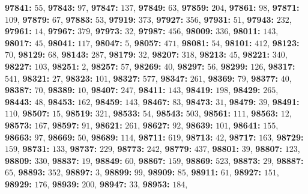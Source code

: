 \textsf{\bfseries 97841:} $55$, \textsf{\bfseries 97843:} $97$, \textsf{\bfseries 97847:} $137$, \textsf{\bfseries 97849:} $63$, \textsf{\bfseries 97859:} $204$, \textsf{\bfseries 97861:} $98$, \textsf{\bfseries 97871:} $109$, \textsf{\bfseries 97879:} $67$, \textsf{\bfseries 97883:} $53$, \textsf{\bfseries 97919:} $373$, \textsf{\bfseries 97927:} $356$, \textsf{\bfseries 97931:} $51$, \textsf{\bfseries 97943:} $232$, \textsf{\bfseries 97961:} $14$, \textsf{\bfseries 97967:} $379$, \textsf{\bfseries 97973:} $32$, \textsf{\bfseries 97987:} $456$, \textsf{\bfseries 98009:} $336$, \textsf{\bfseries 98011:} $143$, \textsf{\bfseries 98017:} $45$, \textsf{\bfseries 98041:} $117$, \textsf{\bfseries 98047:} $5$, \textsf{\bfseries 98057:} $471$, \textsf{\bfseries 98081:} $54$, \textsf{\bfseries 98101:} $412$, \textsf{\bfseries 98123:} $70$, \textsf{\bfseries 98129:} $68$, \textsf{\bfseries 98143:} $287$, \textsf{\bfseries 98179:} $32$, \textsf{\bfseries 98207:} $318$, \textsf{\bfseries 98213:} $45$, \textsf{\bfseries 98221:} $340$, \textsf{\bfseries 98227:} $103$, \textsf{\bfseries 98251:} $2$, \textsf{\bfseries 98257:} $57$, \textsf{\bfseries 98269:} $40$, \textsf{\bfseries 98297:} $56$, \textsf{\bfseries 98299:} $126$, \textsf{\bfseries 98317:} $541$, \textsf{\bfseries 98321:} $27$, \textsf{\bfseries 98323:} $101$, \textsf{\bfseries 98327:} $577$, \textsf{\bfseries 98347:} $261$, \textsf{\bfseries 98369:} $79$, \textsf{\bfseries 98377:} $40$, \textsf{\bfseries 98387:} $70$, \textsf{\bfseries 98389:} $10$, \textsf{\bfseries 98407:} $247$, \textsf{\bfseries 98411:} $143$, \textsf{\bfseries 98419:} $198$, \textsf{\bfseries 98429:} $265$, \textsf{\bfseries 98443:} $48$, \textsf{\bfseries 98453:} $162$, \textsf{\bfseries 98459:} $143$, \textsf{\bfseries 98467:} $83$, \textsf{\bfseries 98473:} $31$, \textsf{\bfseries 98479:} $39$, \textsf{\bfseries 98491:} $110$, \textsf{\bfseries 98507:} $15$, \textsf{\bfseries 98519:} $321$, \textsf{\bfseries 98533:} $54$, \textsf{\bfseries 98543:} $503$, \textsf{\bfseries 98561:} $111$, \textsf{\bfseries 98563:} $12$, \textsf{\bfseries 98573:} $167$, \textsf{\bfseries 98597:} $91$, \textsf{\bfseries 98621:} $261$, \textsf{\bfseries 98627:} $92$, \textsf{\bfseries 98639:} $101$, \textsf{\bfseries 98641:} $155$, \textsf{\bfseries 98663:} $97$, \textsf{\bfseries 98669:} $50$, \textsf{\bfseries 98689:} $114$, \textsf{\bfseries 98711:} $619$, \textsf{\bfseries 98713:} $42$, \textsf{\bfseries 98717:} $163$, \textsf{\bfseries 98729:} $159$, \textsf{\bfseries 98731:} $133$, \textsf{\bfseries 98737:} $229$, \textsf{\bfseries 98773:} $242$, \textsf{\bfseries 98779:} $437$, \textsf{\bfseries 98801:} $39$, \textsf{\bfseries 98807:} $123$, \textsf{\bfseries 98809:} $330$, \textsf{\bfseries 98837:} $19$, \textsf{\bfseries 98849:} $60$, \textsf{\bfseries 98867:} $159$, \textsf{\bfseries 98869:} $523$, \textsf{\bfseries 98873:} $29$, \textsf{\bfseries 98887:} $65$, \textsf{\bfseries 98893:} $352$, \textsf{\bfseries 98897:} $3$, \textsf{\bfseries 98899:} $99$, \textsf{\bfseries 98909:} $85$, \textsf{\bfseries 98911:} $61$, \textsf{\bfseries 98927:} $151$, \textsf{\bfseries 98929:} $176$, \textsf{\bfseries 98939:} $200$, \textsf{\bfseries 98947:} $33$, \textsf{\bfseries 98953:} $184$, 
